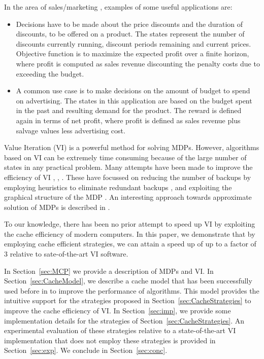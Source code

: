 \documentclass[conference]{IEEEtran}
\begin{document}
In the area of sales/marketing \cite{b9}, examples of some useful applications are:
\begin{itemize}
\item Decisions have to be made about the price discounts and the duration of discounts, to be offered on a product. The states represent the number of discounts currently running, discount periods remaining and current prices. Objective function is to maximize the expected profit over a finite horizon, where profit is computed as sales revenue discounting the penalty costs due to exceeding the budget.
\item A common use case is to make decisions on the amount of budget to spend on advertising. The states in this application are based on the budget spent in the past and resulting demand for the product. The reward is defined again in terms of net profit, where profit is defined as sales revenue plus salvage values less advertising cost.
\end {itemize}

Value Iteration (VI) \cite{suttonbook} is a powerful method for solving MDPs. However, algorithms based on VI can be extremely time consuming because of the large number of states in any practical problem. Many attempts have been made to improve the
efficiency of VI \cite{b10}, \cite{b11}, \cite{wingate_seppi2}. These have focussed on reducing the number of backups
by employing heuristics to eliminate redundant backups \cite{b10}, \cite{b11} and exploiting the 
graphical structure of the MDP \cite{b10}. An interesting approach towards approximate solution of MDPs is described in \cite{ApproxVI}.

To our knowledge, there has been no prior attempt to speed up VI
by exploiting the cache efficiency of modern computers.
In this paper, we demonstrate that by employing cache efficient strategies, we can attain a speed up of up to a factor of 3 relative to sate-of-the-art VI software.

In Section~\ref{sec:MCP} we provide a description of MDPs and VI. In Section~\ref{sec:CacheModel}, we
describe a cache model that has been successfully used before in \cite{chunchun-sahni} to improve the performance of algorithms. This model provides the intuitive support for the strategies proposed in Section~\ref{sec:CacheStrategies} to improve the cache efficiency of VI.
In Section~\ref{sec:imp}, we provide some implementation details for the strategies of Section~\ref{sec:CacheStrategies}. An experimental
evaluation of these strategies relative to a state-of-the-art VI implementation
that does not employ these strategies is provided in Section~\ref{sec:exp}.
We conclude in Section~\ref{sec:conc}.
\end{document}
